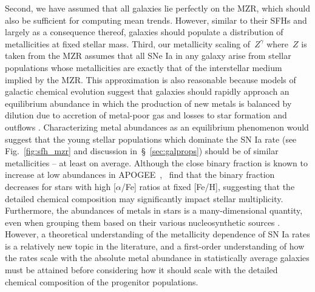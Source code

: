 \documentclass[ms.tex]{subfiles}
\begin{document}
Second, we have assumed that all galaxies lie perfectly on the MZR, which
should also be sufficient for computing mean trends.
However, similar to their SFHs and largely as a consequence thereof, galaxies
should populate a distribution of metallicities at fixed stellar mass.
Third, our metallicity scaling of~$Z^\gamma$ where~$Z$ is taken from the
\citet{Zahid2014} MZR assumes that all SNe Ia in any galaxy arise from stellar
populations whose metallicities are exactly that of the interstellar
medium implied by the MZR.
This approximation is also reasonable because models of galactic chemical
evolution suggest that galaxies should rapidly approach an equilibrium
abundance in which the production of new metals is balanced by dilution due to
accretion of metal-poor gas and losses to star formation and outflows
\citep{Larson1972, Weinberg2017}.
Characterizing metal abundances as an equilibrium phenomenon would suggest that
the young stellar populations which dominate the SN Ia rate (see
Fig.~\ref{fig:sfh_mzr} and discussion in~\S~\ref{sec:galprops}) should be of
similar metallicities -- at least on average.
Although the close binary fraction is known to increase at low abundances
in APOGEE~\citep{Badenes2018, Moe2019},~\citet{Mazzola2020} find that the
binary fraction decreases for stars with high [$\alpha$/Fe] ratios at fixed
[Fe/H], suggesting that the detailed chemical composition may significantly
impact stellar multiplicity.
Furthermore, the abundances of metals in stars is a many-dimensional quantity,
even when grouping them based on their various nucleosynthetic sources
\citep{Ting2022}.
However, a theoretical understanding of the metallicity dependence of SN Ia
rates is a relatively new topic in the literature, and a first-order
understanding of how the rates scale with the absolute metal abundance in
statistically average galaxies must be attained before considering how it
should scale with the detailed chemical composition of the progenitor
populations.
\end{document}
